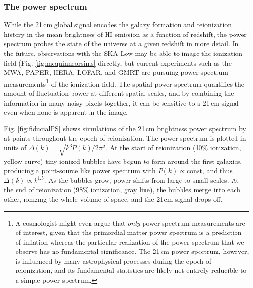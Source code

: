 {\subsubsection{The power spectrum}

While the 21\,cm global signal encodes the galaxy formation and reionization history in the mean brightness of HI emission as a function of redshift, the power spectrum probes the state of the universe at a given redshift in more detail. In the  future, observations with the SKA-Low may be able to image the ionization field (Fig. \ref{fig:mcquinneorsims} directly, but current experiments such as the MWA, PAPER, HERA, LOFAR, and GMRT are pursuing power spectrum measurements\footnote{A cosmologist might even argue that \textit{only} power spectrum measurements are of interest, given that the primordial matter power spectrum is a prediction of inflation whereas the particular realization of the power spectrum that we observe has no fundamental significance. The 21\,cm power spectrum, however, is influenced by many astrophysical processes during the epoch of reionization, and its fundamental statistics are likely not entirely reducible to a simple power spectrum.} of the ionization field. The spatial power spectrum quantifies the amount of fluctuation power at different spatial scales, and by combining the information in many noisy pixels together, it can be sensitive to a 21\,cm signal even when none is apparent in the image. 

Fig. \ref{fig:fiducialPS} shows simulations of the 21\,cm brightness power spectrum by \citet{BarkanaPS2009} at points throughout the epoch of reionization. The power spectrum is plotted in units of $\Delta(k)=\sqrt{k^3 P(k)/2\pi^2}$. At the start of reionization (10\% ionization, yellow curve) tiny ionized bubbles have begun to form around the first galaxies, producing a point-source like power spectrum with $P(k)\propto$const, and thus $\Delta(k)\propto k^{1.5}$. As the bubbles grow, power shifts from large to small scales. At the end of reionization (98\% ionization, gray line), the bubbles merge into each other, ionizing the whole volume of space, and the 21\,cm signal drops off.

}
